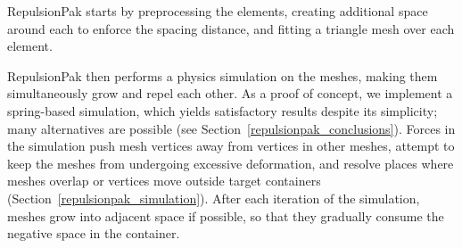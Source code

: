 RepulsionPak starts by preprocessing the elements, creating additional space around
each to enforce the spacing distance, and fitting a triangle mesh over each element.


RepulsionPak then performs a physics simulation on the meshes, 
making them simultaneously grow and repel each other. As a
proof of concept, we implement a spring-based 
simulation, which yields satisfactory results despite its simplicity;
many alternatives are possible 
(see Section~\ref{repulsionpak_conclusions}).
Forces in the simulation push mesh vertices away from vertices in other meshes,
attempt to keep the meshes from undergoing excessive deformation, and resolve
places where meshes overlap or vertices move outside target containers
(Section~\ref{repulsionpak_simulation}).
After each iteration of the simulation, meshes grow into adjacent space
if possible, so that they gradually consume the negative space in the container.

